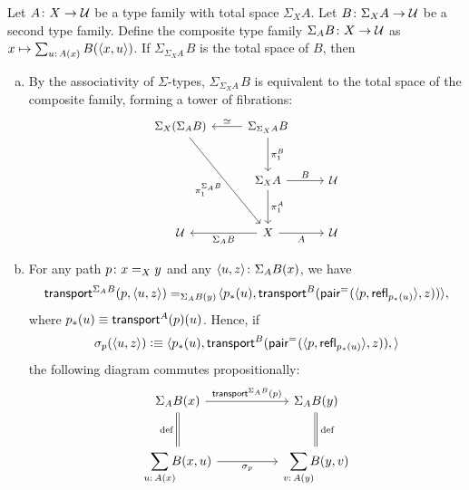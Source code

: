 \begin{thm}\label{thm:composite-transport}
    Let\/ $A\colon X\to\univ$ be a type family with total space\/ $\Sigma_XA$. Let\/ $B\colon \Sigma_XA\to\univ$ be a second type family. Define the composite type family\/ $\Sigma_AB\colon X\to\univ$ as $x\mapsto\sum_{u\colon A(x)}B(\dep{x,u})$. If\/ $\Sigma_{\Sigma_XA\,}B$ is the total space of\/ $B$, then
    \begin{enumerate}[a),font=\upshape]
        \item By the associativity of\/ $\Sigma$-types, $\Sigma_{\Sigma_XA\,}B$ is equivalent to the total space of the composite family, forming a tower of fibrations:
        \[
            \begin{tikzcd}[row sep=large,font=\small]
                \Sigma_X(\Sigma_AB)
                        \arrow[rdd,"\pi_1^{\Sigma_AB}"']
                    &\Sigma_{\Sigma_XA}B
                        \arrow[d,"\pi_1^B"]
                        \arrow[l,"\simeq"']\\
                    &\Sigma_XA
                        \arrow[d,"\pi_1^A"]
                        \arrow[r,"B"]
                    &\univ\\
                \univ
                    &X
                        \arrow[l,"\Sigma_AB"]
                        \arrow[r,"A"']
                    &\univ
            \end{tikzcd}
        \]

        \item For any path\/ $p\colon x\eq Xy$ and any\/ $\dep{u,z}\colon \Sigma_AB(x)$, we have
        \[
            \mathsf{transport}^{\Sigma_AB}(p,\langle u,z\rangle)
            \mathrel{=_{\Sigma_AB(y)}}\!
                \langle
                    p_*(u),
                    \mathsf{transport}^B(\mathsf{pair}^{\mathrel{=_{}}}
                    (\langle p,\mathsf{refl}_{p_*(u)}\rangle,z))
                \rangle,
        \]
        where\/ $p_*(u)\equiv \mathsf{transport}^A(p)(u)$. Hence, if
        \[
            \sigma_p(\langle u,z\rangle)\mathrel{\vcentcolon}\equiv
            \langle
                p_*(u),
                \mathsf{transport}^B(\mathsf{pair}^{\mathrel{=_{}}}
                (\langle p,\mathsf{refl}_{p_*(u)}\rangle,z)),
            \rangle
        \]
        the following diagram commutes propositionally:
        \[
            \begin{tikzcd}[column sep=huge, row sep=large]
                \Sigma_AB(x)
                        \arrow[r,"\fun{transport}^{\Sigma_AB}(p)"]
                        \arrow[d,equal,"\text{\upshape def\,}"']
                    &\Sigma_AB(y)
                        \arrow[d,equal,"\text{\upshape\,def}"]\\
                \displaystyle\sum_{u\colon A(x)}\!\!\!B(x,u)
                        \arrow[r,"\sigma_p"']
                    &\displaystyle\sum_{v\colon A(y)}
                        \!\!\!B(y,v)
            \end{tikzcd}
        \]
    \end{enumerate}
\end{thm}

